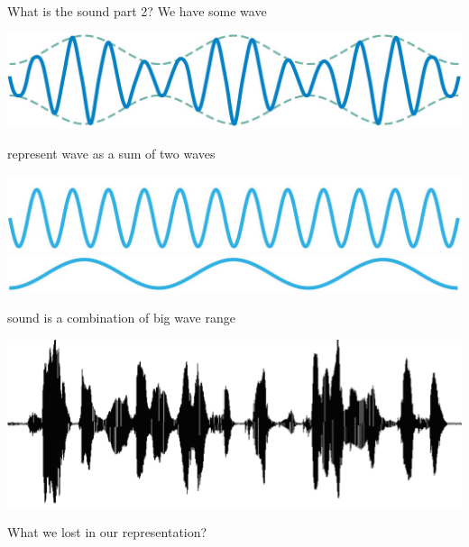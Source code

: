 \documentclass{beamer}
\begin{document}
\begin{frame}{What is the sound part 2?} 
	 We have some wave 
	
		\begin{center}
			\includegraphics[scale=0.1]{img/wave1}
		\end{center}
		
	 represent wave as a sum of two waves 
	
		\begin{center}
			\includegraphics[scale=0.1]{img/wave2}
			\includegraphics[scale=0.1]{img/wave3}
		\end{center}
	
	 sound is a combination of big wave range
	
		\begin{center}
			\includegraphics[scale=0.4]{img/sound_}
		\end{center}
	
	\begin{center}
		 What we lost in our representation?
	\end{center}	
\end{frame}
\end{document}
